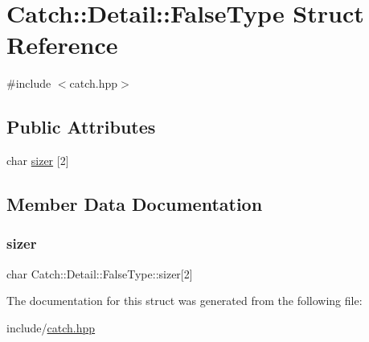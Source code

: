 \hypertarget{struct_catch_1_1_detail_1_1_false_type}{}\section{Catch\+:\+:Detail\+:\+:False\+Type Struct Reference}
\label{struct_catch_1_1_detail_1_1_false_type}


{\ttfamily \#include $<$catch.\+hpp$>$}

\subsection*{Public Attributes}
\begin{DoxyCompactItemize}
\item 
char \mbox{\hyperlink{struct_catch_1_1_detail_1_1_false_type_abc1a730e197d6f7750ae8aaf47b63477}{sizer}} \mbox{[}2\mbox{]}
\end{DoxyCompactItemize}


\subsection{Member Data Documentation}
\mbox{\label{struct_catch_1_1_detail_1_1_false_type_abc1a730e197d6f7750ae8aaf47b63477}} 
\subsubsection{\texorpdfstring{sizer}{sizer}}
{\footnotesize\ttfamily char Catch\+::\+Detail\+::\+False\+Type\+::sizer\mbox{[}2\mbox{]}}



The documentation for this struct was generated from the following file\+:\begin{DoxyCompactItemize}
\item 
include/\mbox{\hyperlink{catch_8hpp}{catch.\+hpp}}\end{DoxyCompactItemize}
